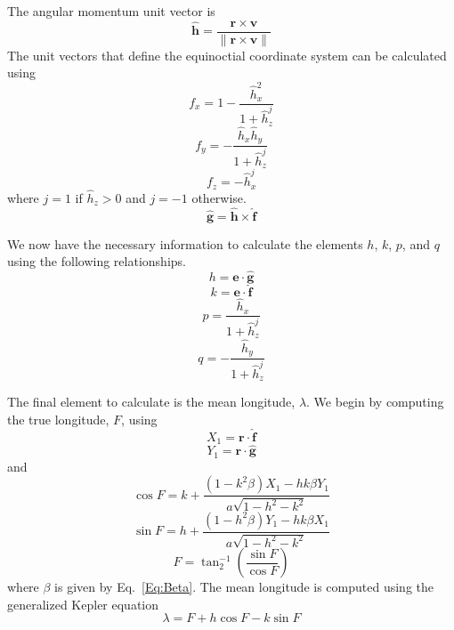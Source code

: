 The angular momentum unit vector is
%
\begin{equation}
   \hat{\mathbf{h}} = \frac{\mathbf{r} \times \mathbf{v} }{ \| \mathbf{r} \times \mathbf{v} \|}
\end{equation}
%
The unit vectors that define the equinoctial coordinate system can
be calculated using
%
\begin{equation}
   f_x = 1 - \frac{\hat{h}_x^2}{ 1 + \hat{h}_z^j}
\end{equation}
%
\begin{equation}
   f_y = -\frac{\hat{h}_x \hat{h}_y}{ 1 + \hat{h}_z^j}
\end{equation}
%
\begin{equation}
   f_z = -\hat{h}_x^j
\end{equation}
%
where $j = 1$ if $ \hat{h}_z > 0 $  and $j = -1$ otherwise. \\
%
\begin{equation}
    \hat{\mathbf{g}} = \hat{\mathbf{h}} \times \hat{\mathbf{f}}
\end{equation}
%

We now have the necessary information to calculate the elements
$h$, $k$, $p$, and $q$ using the following relationships.
%
\begin{equation}
    h = \mathbf{e} \cdot \hat{\mathbf{g}}
\end{equation}
%
\begin{equation}
    k = \mathbf{e} \cdot \hat{\mathbf{f}}
\end{equation}
%
\begin{equation}
    p = \frac{\hat{h}_x}{1+\hat{h}_z^j}
\end{equation}
%
\begin{equation}
    q = - \frac{\hat{h}_y}{1+\hat{h}_z^j}
\end{equation}
%

The final element to calculate is the mean longitude, $\lambda$.
We begin by computing the true longitude, $F$,  using
%
\begin{equation}
    X_1 = \mathbf{r} \cdot \hat{\mathbf{f}}
\end{equation}
%
\begin{equation}
    Y_1 = \mathbf{r} \cdot \hat{\mathbf{g}}
\end{equation}
%
and
%
\begin{equation}
     \cos{F} = k + \frac{ \left( 1 - k^2 \beta \right) X_1 - h k \beta Y_1}{a\sqrt{1 - h^2 - k^2}}
\end{equation}
%
\begin{equation}
     \sin{F} = h + \frac{ \left( 1 - h^2 \beta \right) Y_1 - h k \beta X_1}{a\sqrt{1 - h^2 - k^2}}
\end{equation}
%
\begin{equation}
     F = \tan^{-1}_2\left( \frac{\sin{F}}{\cos{F}}\right)
\end{equation}
%
where $\beta$ is given by Eq.~\ref{Eq:Beta}.  The mean longitude
is computed using the generalized Kepler equation
%
\begin{equation}
    \lambda = F + h \cos{F} - k \sin{F}
\end{equation}

